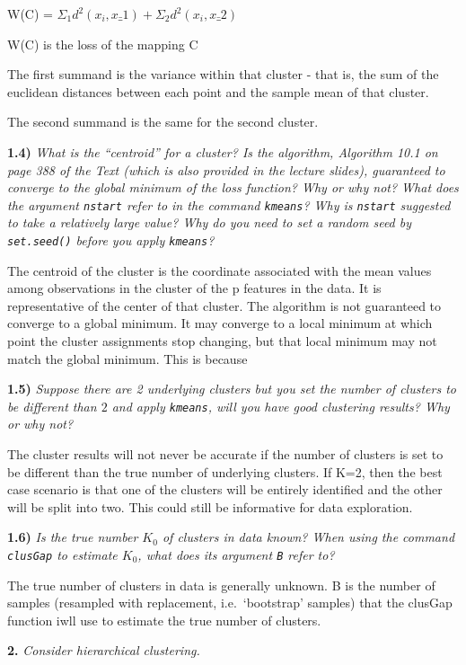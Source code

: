 \documentclass[
]{article}
\begin{document}
W(C) = \(\Sigma_1 d^2(x_i, x\bar_1) + \Sigma_2 d^2(x_i,x\bar_2)\)

W(C) is the loss of the mapping C

The first summand is the variance within that cluster - that is, the sum
of the euclidean distances between each point and the sample mean of
that cluster.

The second summand is the same for the second cluster.

\textbf{1.4)} \emph{What is the ``centroid'' for a cluster? Is the
algorithm, Algorithm 10.1 on page 388 of the Text (which is also
provided in the lecture slides), guaranteed to converge to the global
minimum of the loss function? Why or why not? What does the argument
\texttt{nstart} refer to in the command \texttt{kmeans}? Why is
\texttt{nstart} suggested to take a relatively large value? Why do you
need to set a random seed by \texttt{set.seed()} before you apply
\texttt{kmeans}?}

The centroid of the cluster is the coordinate associated with the mean
values among observations in the cluster of the p features in the data.
It is representative of the center of that cluster. The algorithm is not
guaranteed to converge to a global minimum. It may converge to a local
minimum at which point the cluster assignments stop changing, but that
local minimum may not match the global minimum. This is because

\textbf{1.5)} \emph{Suppose there are 2 underlying clusters but you set
the number of clusters to be different than \(2\) and apply
\texttt{kmeans}, will you have good clustering results? Why or why not?}

The cluster results will not never be accurate if the number of clusters
is set to be different than the true number of underlying clusters. If
K=2, then the best case scenario is that one of the clusters will be
entirely identified and the other will be split into two. This could
still be informative for data exploration.

\textbf{1.6)} \emph{Is the true number \(K_0\) of clusters in data
known? When using the command \texttt{clusGap} to estimate \(K_0\), what
does its argument \texttt{B} refer to?}

The true number of clusters in data is generally unknown. B is the
number of samples (resampled with replacement, i.e.~`bootstrap' samples)
that the clusGap function iwll use to estimate the true number of
clusters.

\noindent \textbf{2.} \emph{Consider hierarchical clustering.}
\end{document}
